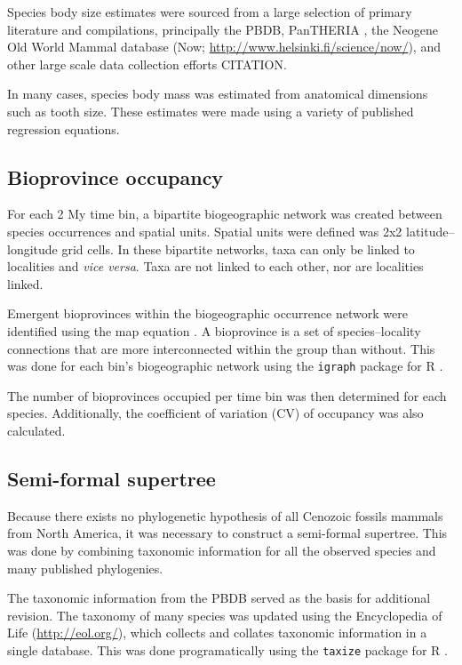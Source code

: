 \documentclass[12pt,letterpaper]{article}
\begin{document}
Species body size estimates were sourced from a large selection of primary literature and compilations, principally the PBDB, PanTHERIA \citep{Jones2009c}, the Neogene Old World Mammal database (Now; \url{http://www.helsinki.fi/science/now/}), and other large scale data collection efforts \citep{Smith2004c, Raia2012f, Brook2004a, Freudenthal2013, McKenna2011} CITATION. %

In many cases, species body mass was estimated from anatomical dimensions such as tooth size. These estimates were made using a variety of published regression equations. %


\subsection{Bioprovince occupancy}

For each 2 My time bin, a bipartite biogeographic network was created between species occurrences and spatial units. Spatial units were defined was 2x2 latitude--longitude grid cells. In these bipartite networks, taxa can only be linked to localities and \textit{vice versa}. Taxa are not linked to each other, nor are localities linked. 

Emergent bioprovinces within the biogeographic occurrence network were identified using the map equation \citep{Rosvall2008,Rosvall2009a}. A bioprovince is a set of species--locality connections that are more interconnected within the group than without. This was done for each bin's biogeographic network using the \texttt{igraph} package for R \citep{csardi2006igraph,2014language}. 

The number of bioprovinces occupied per time bin was then determined for each species. Additionally, the coefficient of variation (CV) of occupancy was also calculated.


\subsection{Semi-formal supertree}

Because there exists no phylogenetic hypothesis of all Cenozoic fossils mammals from North America, it was necessary to construct a semi-formal supertree. This was done by combining taxonomic information for all the observed species and many published phylogenies.

The taxonomic information from the PBDB served as the basis for additional revision. The taxonomy of many species was updated using the Encyclopedia of Life (\url{http://eol.org/}), which collects and collates taxonomic information in a single database. This was done programatically using the \texttt{taxize} package for R \citep{2013taxize}.
\end{document}
